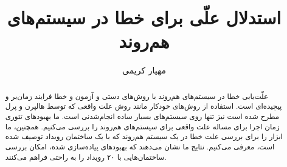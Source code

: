\documentclass{article}
\title{استدلال علّی برای خطا در سیستم‌های هم‌روند}
\author{مهیار کریمی}
\theoremstyle{definition}
\theoremstyle{remark}
\begin{document}
\maketitle

\begin{abstract}
  علّت‌یابی خطا در سیستم‌های هم‌روند با
  روش‌های دستی و آزمون و خطا فرایند زمان‌بر
  و پیچیده‌ای است. استفاده از روش‌های
  خودکار مانند روش علت واقعی که توسط
  هالپرن و پرل مطرح شده است نیز تنها
  روی سیستم‌های بسیار ساده انجام‌شدنی است.
  ما بهبودهای تئوری زمان اجرا برای مساله علت واقعی
  برای سیستم‌های هم‌روند را بررسی می‌کنیم.
  همچنین، ما ابزار
  را برای بررسی علت خطا در یک سیستم هم‌روند
  که با یک ساختمان رویداد توصیف شده است، معرفی می‌کنیم.
  نتایج ما نشان می‌دهند که بهبودهای پیاده‌سازی شده،
  امکان بررسی ساختمان‌هایی با ۲۰ رویداد را
  به راحتی فراهم می‌کنند.
\end{abstract}







\end{document}
